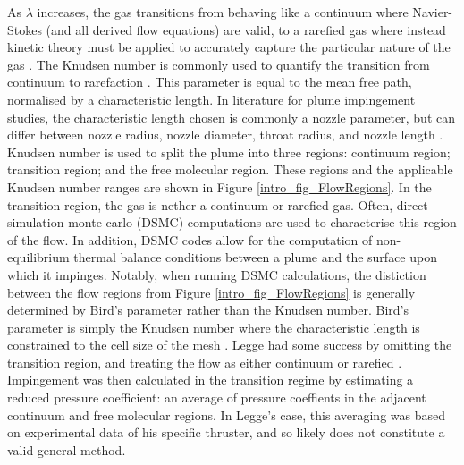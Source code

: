 \documentclass[journal]{new-aiaa}
\begin{document}
As $\lambda$ increases, the gas transitions from behaving like a continuum where Navier-Stokes (and all derived flow equations) are valid, to a rarefied gas where instead kinetic theory must be applied to accurately capture the particular nature of the gas \cite{pittPlumeImpingementStudies}. The Knudsen number is commonly used to quantify the transition from continuum to rarefaction \cite{knudsenGesetzeMolekularstromungUnd2006}. This parameter is equal to the mean free path, normalised by a characteristic length. In literature for plume impingement studies, the characteristic length chosen is commonly a nozzle parameter, but can differ between nozzle radius, nozzle diameter, throat radius, and nozzle length \cite{caiGaskineticSolutionsHigh2013,sharmaDSMCSimulationRocket2023,singhalNumericalStudyNozzle2024,subramanianUnderexpandedJetImpingement2024}. Knudsen number is used to split the plume into three regions: continuum region; transition region; and the free molecular region. These regions and the applicable Knudsen number ranges are shown in Figure \ref{intro_fig_FlowRegions}. In the transition region, the gas is nether a continuum or rarefied gas. Often, direct simulation monte carlo (DSMC) computations are used to characterise this region of the flow. In addition, DSMC codes allow for the computation of non-equilibrium thermal balance conditions between a plume and the surface upon which it impinges. Notably, when running DSMC calculations, the distiction between the flow regions from Figure \ref{intro_fig_FlowRegions} is generally determined by Bird's parameter rather than the Knudsen number. Bird's parameter is simply the Knudsen number where the characteristic length is constrained to the cell size of the mesh \cite{birdMolecularGasDynamics2003}. Legge had some success by omitting the transition region, and treating the flow as either continuum or rarefied \cite{leggeModellingControlThruster1982}. Impingement was then calculated in the transition regime by estimating a reduced pressure coefficient: an average of pressure coeffients in the adjacent continuum and free molecular regions. In Legge's case, this averaging was based on experimental data of his specific thruster, and so likely does not constitute a valid general method.
\end{document}
